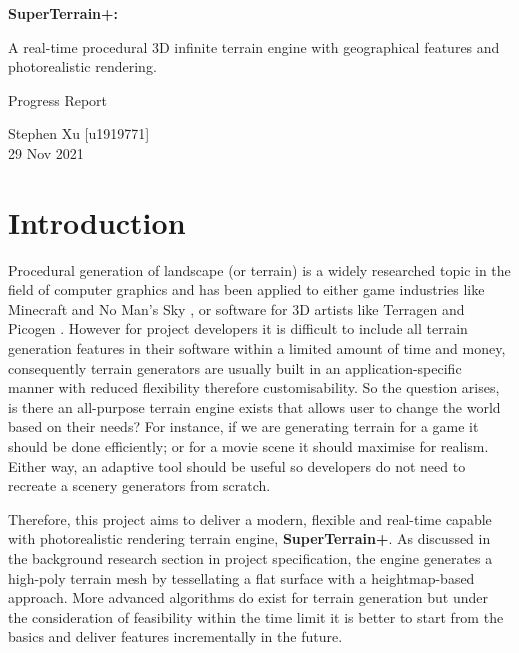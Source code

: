 \documentclass[oneside, a4paper]{article}
\begin{document}
    \begin{titlepage}
        \begin{center}
            \huge
            \vspace*{4cm}
            \textbf{SuperTerrain+:}

            \vspace*{1cm}
            A real-time procedural 3D infinite terrain engine with geographical features and photorealistic rendering.

            \LARGE
            \vspace*{2cm}
            Progress Report

            \vspace*{1cm}
            Stephen Xu [u1919771] \\
            29 Nov 2021
        \end{center}
    \end{titlepage}
    \newpage
    \large
    \flushleft

    \section{Introduction}
    Procedural generation of landscape (or terrain) is a widely researched topic in the field of computer graphics and has been applied to either game industries like Minecraft \cite{mc} and No Man's Sky \cite{no_mans_sky}, or software for 3D artists like Terragen \cite{terragen} and Picogen \cite{picogen}. However for project developers it is difficult to include all terrain generation features in their software within a limited amount of time and money, consequently terrain generators are usually built in an application-specific manner with reduced flexibility therefore customisability. So the question arises, is there an all-purpose terrain engine exists that allows user to change the world based on their needs? For instance, if we are generating terrain for a game it should be done efficiently; or for a movie scene it should maximise for realism. Either way, an adaptive tool should be useful so developers do not need to recreate a scenery generators from scratch.

    Therefore, this project aims to deliver a modern, flexible and real-time capable with photorealistic rendering terrain engine, \textbf{SuperTerrain+}. As discussed in the background research section in project specification, the engine generates a high-poly terrain mesh by tessellating a flat surface with a heightmap-based approach. More advanced algorithms do exist for terrain generation but under the consideration of feasibility within the time limit it is better to start from the basics and deliver features incrementally in the future.
\end{document}
